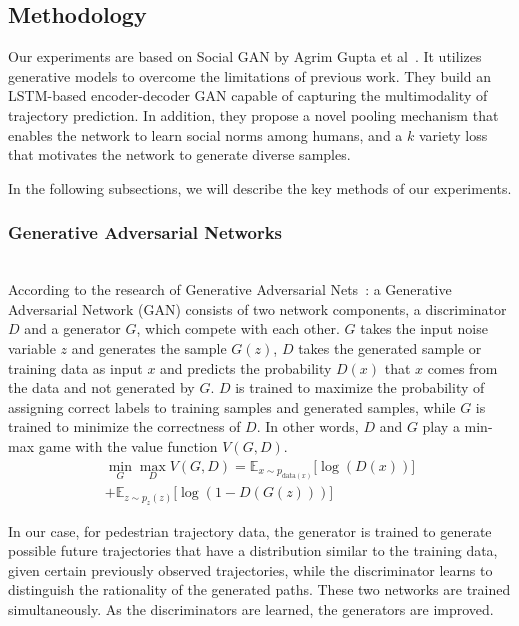 \subsection{Methodology}

Our experiments are based on Social GAN by Agrim Gupta et al~\cite{Gupta_2018_CVPR}. It utilizes generative models to overcome the limitations of previous work. They build an LSTM-based encoder-decoder GAN capable of capturing the multimodality of trajectory prediction. In addition, they propose a novel pooling mechanism that enables the network to learn social norms among humans, and a $k$ variety loss that motivates the network to generate diverse samples.

In the following subsections, we will describe the key methods of our experiments.


\subsubsection{Generative Adversarial Networks}
\hfill \\
According to the research of Generative Adversarial Nets~\cite{gan}: a Generative Adversarial Network (GAN) consists of two network components, a discriminator $D$ and a generator $G$, which compete with each other. $G$ takes the input noise variable $z$ and generates the sample $G(z)$, $D$ takes the generated sample or training data as input $x$ and predicts the probability $D(x)$ that $x$ comes from the data and not generated by $G$. $D$ is trained to maximize the probability of assigning correct labels to training samples and generated samples, while $G$ is trained to minimize the correctness of $D$. In other words, $D$ and $G$ play a min-max game with the value function $V(G, D)$.
\begin{multline}
  \min_{G} \max_{D} V(G, D) = \mathbb{E}_{x \sim p_{\text{data}(x)}} \lbrack \log(D(x))\rbrack \\ + \mathbb{E}_{z \sim p_{z}(z)} \lbrack \log(1 - D(G(z))) \rbrack
\end{multline}

In our case, for pedestrian trajectory data, the generator is trained to generate possible future trajectories that have a distribution similar to the training data, given certain previously observed trajectories, while the discriminator learns to distinguish the rationality of the generated paths. These two networks are trained simultaneously. As the discriminators are learned, the generators are improved.

